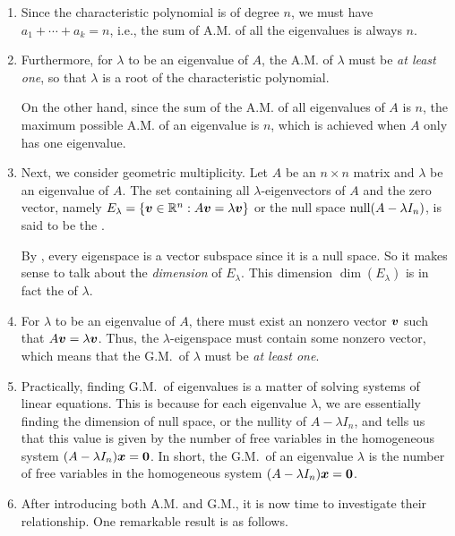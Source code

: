 \begin{enumerate}
\item \label{it:am-sum2n} Since the characteristic polynomial is of degree
\(n\), we must have \(a_1+\dotsb+a_k=n\), i.e., the sum of A.M. of all the
eigenvalues is always \(n\).

\item \label{it:am-bounds} Furthermore, for \(\lambda\) to be an eigenvalue of
\(A\), the A.M. of \(\lambda\) must be \emph{at least one}, so that
\(\lambda\) is a root of the characteristic polynomial.

On the other hand, since the sum of the A.M. of all eigenvalues of \(A\) is
\(n\), the maximum possible A.M. of an eigenvalue is \(n\), which is achieved
when \(A\) only has one eigenvalue.

\item Next, we consider geometric multiplicity. Let \(A\) be an \(n\times n\)
matrix and \(\lambda\) be an eigenvalue of \(A\). The set containing all
\(\lambda\)-eigenvectors of \(A\) and the zero vector, namely
\(E_{\lambda}=\{\vb*{v}\in\mathbb{R}^n:A\vb*{v}=\lambda\vb*{v}\}\) or the null space
\(\operatorname{null}(A-\lambda I_n)\), is said to be the .

By , every eigenspace is a vector subspace since it
is a null space. So it makes sense to talk about the \emph{dimension} of
\(E_{\lambda}\). This dimension \(\dim(E_{\lambda})\) is in fact the
 of \(\lambda\).

\item \label{it:gm-lb} For \(\lambda\) to be an eigenvalue of \(A\), there must
exist an nonzero vector \(\vb*{v}\) such that \(A\vb*{v}=\lambda\vb*{v}\).
Thus, the \(\lambda\)-eigenspace must contain some nonzero vector, which means
that the G.M.\ of \(\lambda\) must be \emph{at least one}.

\item Practically, finding G.M.\ of eigenvalues is a matter of solving systems
of linear equations. This is because for each eigenvalue \(\lambda\), we are
essentially finding the dimension of null space, or the nullity of \(A-\lambda
I_n\), and  tells us that this value is given by
the number of free variables in the homogeneous system
\((A-\lambda I_n)\vb*{x}=\vb*{0}\). In short, the G.M.\ of an eigenvalue
\(\lambda\) is the number of free variables in the homogeneous system
\((A-\lambda I_n)\vb*{x}=\vb*{0}\).

\item After introducing both A.M. and G.M., it is now time to investigate their
relationship. One remarkable result is as follows.


\end{enumerate}
